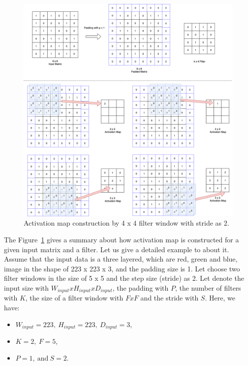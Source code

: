 \begin{figure}[h]
	\centering
	\includegraphics[width=\linewidth]{fig/conv_layer.png}
	\vspace*{2mm}
	\caption{Activation map construction by 4 x 4 filter window with stride as 2.}
	\label{conv_layer}
\end{figure}

The Figure~\ref{conv_layer} gives a summary about how activation map is constructed for a given input matrix and a filter. Let us give a detailed example to about it. Assume that the input data is a three layered, which are red, green and blue, image in the shape of 223 x 223 x 3, and the padding size is 1. Let choose two filter windows in the size of 5 x 5 and the step size (stride) as 2. Let denote the input size with $W_{input} x H_{input} x D_{input}$, the padding with $P$, the number of filters with $K$, the size of a filter window with $F x F$ and the stride with $S$. Here, we have:

\begin{itemize}
    \item $W_{input} = 223, \: H_{input} = 223, \: D_{input} = 3$,
    \item $K = 2, \: F = 5$,
    \item $P = 1, \: \text{and} \: S = 2$.
\end{itemize}

